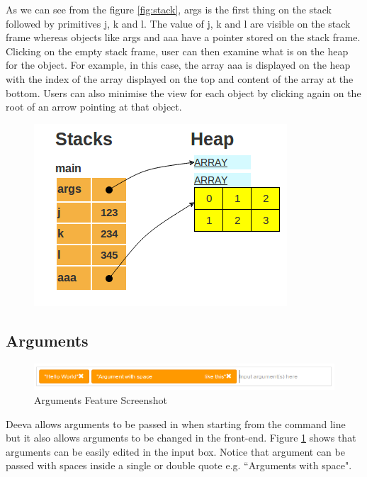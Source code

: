 \documentclass[11pt, a4paper]{article}
\begin{document}
As we can see from the figure \ref{fig:stack}, args is the first thing on the stack followed by primitives j, k and l.
The value of j, k and l are visible on the stack frame whereas objects like args and aaa have a pointer stored on the stack frame.
Clicking on the empty stack frame, user can then examine what is on the heap for the object.
For example, in this case, the array aaa is displayed on the heap with the index of the array displayed on the top and content of the array at the bottom. 
Users can also minimise the view for each object by clicking again on the root of an arrow pointing at that object.
\begin{figure}[h!]
\centering
\includegraphics[scale=0.5]{heap.png}
\end{figure}

\subsection{Arguments}
\begin{figure}[h!]
\centering
\includegraphics[scale=0.7]{argumentFeature.png}
\caption{Arguments Feature Screenshot}
\label{fig:argumentFeature}
\end{figure}
Deeva allows arguments to be passed in when starting from the command line but it also allows arguments to be changed in the front-end.
Figure \ref{fig:argumentFeature} shows that arguments can be easily edited in the input box. Notice that argument can be passed with spaces inside a single or double quote e.g. ``Arguments with space".
\end{document}
